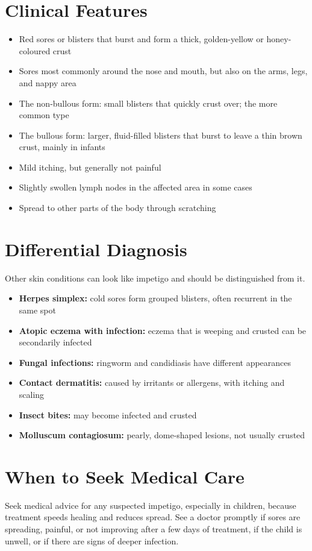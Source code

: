 \section*{Clinical Features}
\begin{itemize}
    \item Red sores or blisters that burst and form a thick, golden-yellow or honey-coloured crust
    \item Sores most commonly around the nose and mouth, but also on the arms, legs, and nappy area
    \item The non-bullous form: small blisters that quickly crust over; the more common type
    \item The bullous form: larger, fluid-filled blisters that burst to leave a thin brown crust, mainly in infants
    \item Mild itching, but generally not painful
    \item Slightly swollen lymph nodes in the affected area in some cases
    \item Spread to other parts of the body through scratching
\end{itemize}

\section*{Differential Diagnosis}
Other skin conditions can look like impetigo and should be distinguished from it.
\begin{itemize}
    \item \textbf{Herpes simplex:} cold sores form grouped blisters, often recurrent in the same spot
    \item \textbf{Atopic eczema with infection:} eczema that is weeping and crusted can be secondarily infected
    \item \textbf{Fungal infections:} ringworm and candidiasis have different appearances
    \item \textbf{Contact dermatitis:} caused by irritants or allergens, with itching and scaling
    \item \textbf{Insect bites:} may become infected and crusted
    \item \textbf{Molluscum contagiosum:} pearly, dome-shaped lesions, not usually crusted
\end{itemize}

\section*{When to Seek Medical Care}
Seek medical advice for any suspected impetigo, especially in children, because treatment speeds healing and reduces spread. See a doctor promptly if sores are spreading, painful, or not improving after a few days of treatment, if the child is unwell, or if there are signs of deeper infection.

